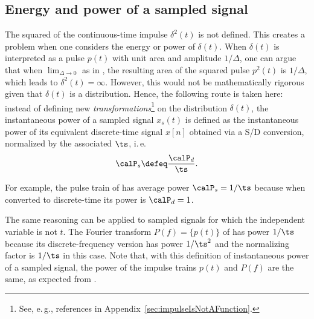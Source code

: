 \subsection{Energy and power of a sampled signal}
\label{sec:sampledSignalEnergyPower}


The squared of the continuous-time impulse $\delta^2(t)$ is not defined. This creates a problem when one considers the energy or power of $\delta(t)$.
When $\delta(t)$ is interpreted as a pulse $p(t)$ with unit area and amplitude $1/\Delta$, one can argue that when $\lim_{\Delta \rightarrow 0}$ as in , the resulting area of the squared pulse $p^2(t)$ is $1/\Delta$, which leads to $\delta^2(t) = \infty$. However, this would not be mathematically rigorous given that $\delta(t)$ is a distribution. Hence, the following route is taken here: instead of defining new \emph{transformations}\footnote{See, e.\,g., references in Appendix~\ref{sec:impulseIsNotAFunction}.} on the distribution $\delta(t)$, the instantaneous power of a sampled signal $x_s(t)$ is defined as the instantaneous power of its equivalent discrete-time signal $x[n]$ obtained via a S/D conversion, normalized by the associated $\ts$, i.\,e.
\begin{equation}
\calP_s \defeq \frac{\calP_d}{\ts}.
\label{eq:powerSampledSignal}
\end{equation}

For example, the pulse train of  has average power $\calP_s=1/\ts$ because when converted to discrete-time its power is $\calP_d=1$.

The same reasoning can be applied to sampled signals for which the independent variable is not $t$. The Fourier transform $P(f) = \{ p(t) \}$ of  has power $1/\ts$ because its discrete-frequency version has power $1/\ts^2$ and the normalizing factor is $1/\ts$ in this case. Note that, with this definition of instantaneous power of a sampled signal, the power of the impulse trains $p(t)$ and $P(f)$ are the same, as expected from .

